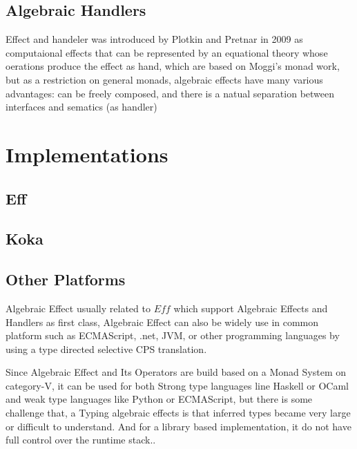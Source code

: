 \documentclass{article}
\begin{document}
\subsection{Algebraic Handlers}
Effect and handeler was introduced by Plotkin and Pretnar in 2009 \cite{lmcs:705} as computaional effects that can be represented by an equational theory whose oerations produce the effect as hand, which are based on Moggi's monad work, but as a restriction on general monads, algebraic effects have many various advantages: can be freely composed, and there is a natual separation between interfaces and sematics (as handler) \cite{algebraic-effects-for-functional-programming}

\section{Implementations}
\subsection{Eff}
\subsection{Koka}
\subsection{Other Platforms}

Algebraic Effect usually related to $Eff$ which support Algebraic Effects and Handlers as first class,    Algebraic Effect can also be widely use in common platform such as ECMAScript, .net, JVM, or other programming languages by using a type directed selective CPS translation\cite{algebraic-effects-for-functional-programming}.

Since Algebraic Effect and Its Operators are build based on a Monad System on category-V, it can be used for both Strong type languages line Haskell or OCaml and weak type languages like Python or ECMAScript, but there is some challenge that, a Typing algebraic effects is that inferred types became very large or difficult to understand. And for a library based implementation, it do not have full control over the runtime stack.\cite{algebraic-effects-for-functional-programming}.
\end{document}
